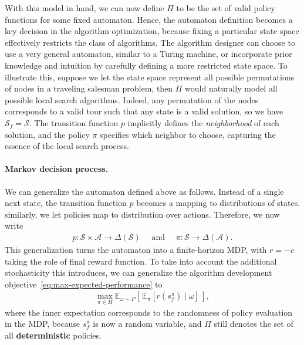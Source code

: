 \documentclass[a4paper]{report}
\theoremstyle{definition}
\theoremstyle{plain}
\begin{document}
With this model in hand, we can now define $\Pi$ to be the set of valid policy
functions for some fixed automaton.
%
Hence, the automaton definition becomes a key decision in the algorithm
optimization, because fixing a particular state space effectively restricts the
class of algorithms.
%
The algorithm designer can choose to use a very general automaton, similar to a
Turing machine, or incorporate prior knowledge and intuition by carefully
defining a more restricted state space.
To illustrate this, suppose we let the state space represent all possible
permutations of nodes in a traveling salesman problem, then $\Pi$ would
naturally model all possible local search algorithms.
%
Indeed, any permutation of the nodes corresponds to a valid tour such that any
state is a valid solution, so we have $\mathcal{S}_f = \mathcal{S}$.
%
The transition function $p$ implicitly defines the \emph{neighborhood} of each
solution, and the policy $\pi$ specifies which neighbor to choose, capturing the
essence of the local search process.

\paragraph{Markov decision process.}
We can generalize the automaton defined above as follows.
Instead of a single next state, the transition function $p$ becomes a mapping to
distributions of states.
similarly, we let policies map to distribution over actions.
Therefore, we now write
\begin{align*}
  p : \mathcal{S} \times \mathcal{A} \rightarrow \Delta(\mathcal{S}) \quad \text{ and }
  \quad \pi : \mathcal{S} \rightarrow \Delta(\mathcal{A}) .
\end{align*}
%
This generalization turns the automaton into a finite-horizon MDP, with $r = {-c}$
taking the role of final reward function.
%
To take into account the additional stochasticity this introduces, we can generalize the algorithm development objective~\eqref{eq:max-expected-performance} to
\begin{align}\label{eq:max-mdp-performance}
  \max_{\pi \in \Pi} \mathbb{E}_{\omega \sim P} \left[ \, \mathbb{E}_\pi \left[ r(s_f^\pi) \mid \omega \right] \, \right] ,
\end{align}
where the inner expectation corresponds to the randomness of policy evaluation
in the MDP, because $s_f^\pi$ is now a random variable, and $\Pi$ still denotes
the set of all \textbf{deterministic} policies.
\end{document}
